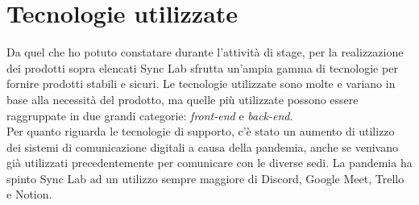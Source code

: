 
\section{Tecnologie utilizzate}
Da quel che ho potuto constatare durante l'attività di stage, per la realizzazione dei prodotti sopra elencati Sync Lab sfrutta un'ampia gamma di tecnologie per fornire prodotti stabili e sicuri. Le tecnologie utilizzate sono molte e variano in base alla necessità del prodotto, ma quelle più utilizzate possono essere raggruppate in due grandi categorie: \textit{front-end} e \textit{back-end}. \\

Per quanto riguarda le tecnologie di supporto, c'è stato un aumento di utilizzo dei sistemi di comunicazione digitali a causa della pandemia, anche se venivano già utilizzati precedentemente per comunicare con le diverse sedi. La pandemia ha spinto Sync Lab ad un utilizzo sempre maggiore di Discord, Google Meet, Trello e Notion.

